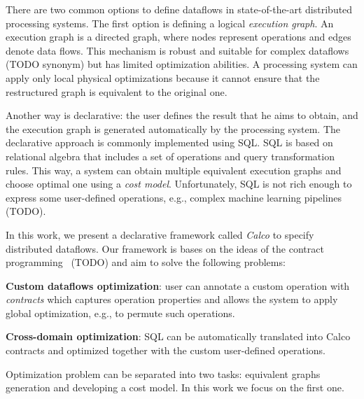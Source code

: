 There are two common options to define dataflows in state-of-the-art distributed processing systems.
The first option is defining a logical {\em execution graph}.
An execution graph is a directed graph, where nodes represent operations and edges denote data flows.
This mechanism is robust and suitable for complex dataflows (TODO synonym) but has limited optimization abilities.
A processing system can apply only local physical optimizations because it cannot ensure that the restructured graph is equivalent to the original one.

Another way is declarative: the user defines the result that he aims to obtain, and the execution graph is generated automatically by the processing system.
The declarative approach is commonly implemented using SQL.
SQL is based on relational algebra that includes a set of operations and query transformation rules.
This way, a system can obtain multiple equivalent execution graphs and choose optimal one using a {\em cost model}.
Unfortunately, SQL is not rich enough to express some user-defined operations, e.g., complex machine learning pipelines~\cite{PROOF} (TODO).

In this work, we present a declarative framework called {\em Calco} to specify distributed dataflows.
Our framework is bases on the ideas of the contract programming~\cite{REF} (TODO) and aim to solve the following problems:

{\bf Custom dataflows optimization}: user can annotate a custom operation with {\em contracts} which captures operation properties and allows the system to apply global optimization, e.g., to permute such operations.

{\bf Cross-domain optimization}: SQL can be automatically translated into Calco contracts and optimized together with the custom user-defined operations.

Optimization problem can be separated into two tasks: equivalent graphs generation and developing a cost model.
In this work we focus on the first one.
